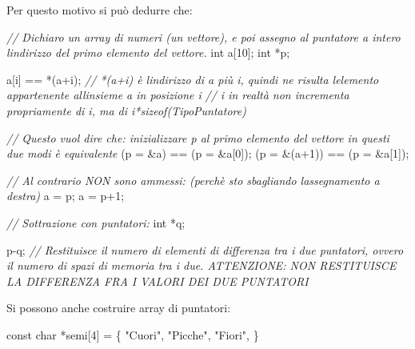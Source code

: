 \documentclass[
]{article}
\newenvironment{Shaded}{}{}
\newcommand{\CommentTok}[1]{\textcolor[rgb]{0.38,0.63,0.69}{\textit{#1}}}
\newcommand{\DataTypeTok}[1]{\textcolor[rgb]{0.56,0.13,0.00}{#1}}
\newcommand{\DecValTok}[1]{\textcolor[rgb]{0.25,0.63,0.44}{#1}}
\newcommand{\NormalTok}[1]{#1}
\newcommand{\StringTok}[1]{\textcolor[rgb]{0.25,0.44,0.63}{#1}}
\begin{document}
Per questo motivo si può dedurre che:

\begin{Shaded}
\begin{Highlighting}[]
\CommentTok{// Dichiaro un array di numeri (un vettore), e poi assegno al puntatore a intero l\textquotesingle{}indirizzo del primo elemento del vettore. }
\DataTypeTok{int}\NormalTok{ a[}\DecValTok{10}\NormalTok{];}
\DataTypeTok{int}\NormalTok{ *p;}

\NormalTok{a[i] == *(a+i); }
\CommentTok{// *(a+i) è l\textquotesingle{}indirizzo di \textquotesingle{}a\textquotesingle{} più \textquotesingle{}i\textquotesingle{}, quindi ne risulta l\textquotesingle{}elemento appartenente all\textquotesingle{}insieme \textquotesingle{}a\textquotesingle{} in posizione \textquotesingle{}i\textquotesingle{}}
\CommentTok{// \textquotesingle{}i\textquotesingle{} in realtà non incrementa propriamente di i, ma di i*sizeof(TipoPuntatore)}

\CommentTok{// Questo vuol dire che: inizializzare p al primo elemento del vettore in questi due modi è equivalente}
\NormalTok{(p = \&a) == (p = \&a[}\DecValTok{0}\NormalTok{]);}
\NormalTok{(p = \&(a+}\DecValTok{1}\NormalTok{)) == (p = \&a[}\DecValTok{1}\NormalTok{]);}

\CommentTok{// Al contrario NON sono ammessi: (perchè sto sbagliando l\textquotesingle{}assegnamento a destra)}
\NormalTok{a = p;}
\NormalTok{a = p+}\DecValTok{1}\NormalTok{;}

\CommentTok{// Sottrazione con puntatori:}
\DataTypeTok{int}\NormalTok{ *q;}

\NormalTok{p{-}q; }\CommentTok{// Restituisce il numero di elementi di differenza tra i due puntatori, ovvero il numero di spazi di memoria tra i due. ATTENZIONE: NON RESTITUISCE LA DIFFERENZA FRA I VALORI DEI DUE PUNTATORI}
\end{Highlighting}
\end{Shaded}

Si possono anche costruire array di puntatori:

\begin{Shaded}
\begin{Highlighting}[]
\DataTypeTok{const} \DataTypeTok{char}\NormalTok{ *semi[}\DecValTok{4}\NormalTok{] = \{}
    \StringTok{"Cuori"}\NormalTok{,}
    \StringTok{"Picche"}\NormalTok{,}
    \StringTok{"Fiori"}\NormalTok{,}
\NormalTok{\}}
\end{Highlighting}
\end{Shaded}
\end{document}
